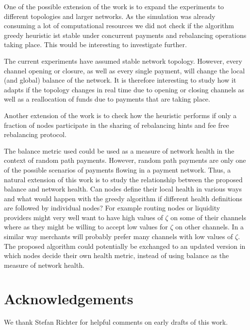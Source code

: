 \documentclass[a4paper]{paper}
\begin{document}
One of the possible extension of the work is to expand the experiments to different topologies and larger networks.
As the simulation was already consuming a lot of computational resources we did not check if the algorithm greedy heuristic ist stable under concurrent payments and rebalancing operations taking place. 
This would be interesting to investigate further.

The current experiments have assumed stable network topology. 
However, every channel opening or closure, as well as every single payment, will change the local (and global) balance of the network.
It is therefore interesting to study how it adapts if the topology changes in real time due to opening or closing channels as well as a reallocation of funds due to payments that are taking place. 

Another extension of the work is to check how the heuristic performs if only a fraction of nodes participate in the sharing of rebalancing hints and fee free rebalancing protocol.

The balance metric used could be used as a measure of network health in the context of random path payments. 
However, random path payments are only one of the possible scenarios of payments flowing in a payment network. 
Thus, a natural extension of this work is to 
study the relationship between the proposed balance and network health. Can nodes define their local health in various ways and what would happen with the greedy algorithm if different health definitions are followed by individual nodes?
For example routing nodes or liquidity providers might very well want to have high values of $\zeta$ on some of their channels where as they might be willing to accept low values for $\zeta$ on other channels.
In a similar way merchants will probably prefer many channels with low values of $\zeta$.
The proposed algorithm could potentially be exchanged to an updated version in which nodes decide their own health metric,
instead of using balance as the measure of network health.


\section{Acknowledgements}
\label{sec:ack}
We thank Stefan Richter for helpful comments on early drafts of this work.
\end{document}
